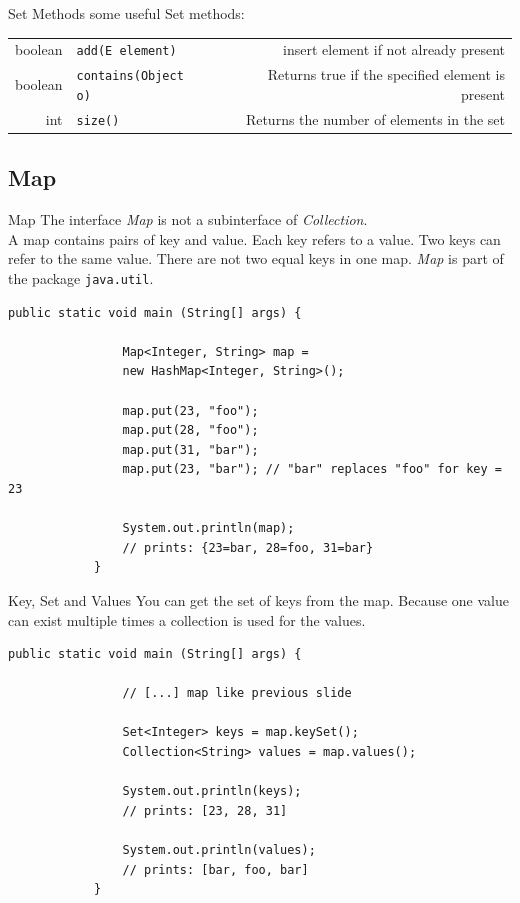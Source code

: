 	\begin{frame}[fragile]{Set Methods}
		some useful Set methods:\\
		\vspace{1em}
		\begin{tabular}{ r l r }
			boolean & \texttt{add(E element)}
			& \footnotesize{insert element if not already present} \\
			boolean &\texttt{contains(Object o)}
			& \footnotesize{Returns true if the specified element is present} \\
			int &\texttt{size()}
			& \footnotesize{Returns the number of elements in the set} \\
		\end{tabular}
	
	\end{frame}
	
	\subsection{Map}
	\begin{frame}[fragile]{Map}
		The interface \emph{Map} is not a subinterface of \emph{Collection}.\\
		A map contains pairs of key and value. Each key refers to a value. 
		Two keys can refer to the same value. There are not two equal keys in one map.
		\emph{Map} is part of the package \texttt{java.util}.
		\vfill
		\begin{lstlisting}[basicstyle=\ttfamily\scriptsize]
			public static void main (String[] args) {
				
				Map<Integer, String> map = 
				new HashMap<Integer, String>();
				
				map.put(23, "foo");
				map.put(28, "foo");
				map.put(31, "bar");
				map.put(23, "bar"); // "bar" replaces "foo" for key = 23
				
				System.out.println(map);
				// prints: {23=bar, 28=foo, 31=bar}
			}
		\end{lstlisting}
	\end{frame}
	
	\begin{frame}[fragile]{Key, Set and Values}
		You can get the set of keys from the map.
		Because one value can exist multiple times a collection is used for the values.
		\begin{lstlisting}[basicstyle=\ttfamily\scriptsize]
			public static void main (String[] args) {
				
				// [...] map like previous slide
				
				Set<Integer> keys = map.keySet();
				Collection<String> values = map.values();
				
				System.out.println(keys);
				// prints: [23, 28, 31]
				
				System.out.println(values);
				// prints: [bar, foo, bar]
			}
		\end{lstlisting}
	\end{frame}
	
